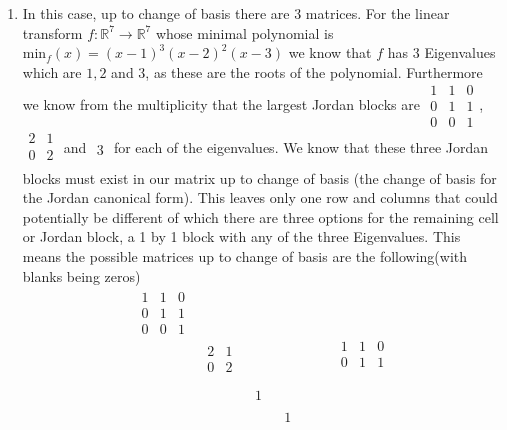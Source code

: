 \documentclass[12pt]{amsart}
\theoremstyle{definition}
\newcommand{\R}{\mathbb{R}}
\newcommand{\ra}{\rightarrow}
\begin{document}
\begin{enumerate}
\item In this case, up to change of basis there are $3$ matrices. For the linear transform $f:\R^7\ra \R^7$ whose minimal polynomial is $\text{min}_f(x)=(x-1)^3(x-2)^2(x-3)$ we know that $f$ has $3$ Eigenvalues which are $1,2$ and $3$, as these are the roots of the polynomial. Furthermore we know from the multiplicity that the largest Jordan blocks are $\boxed{\begin{matrix} 
1 & 1 & 0\\
0 & 1 & 1\\
0 & 0 & 1
\end{matrix}}$, $\boxed{\begin{matrix} 
2 & 1\\
0 & 2\\
\end{matrix}}$ and $\boxed{\begin{matrix} 
3
\end{matrix}}$ for each of the eigenvalues. We know that these three Jordan blocks must exist in our matrix up to change of basis (the change of basis for the Jordan canonical form). This leaves only one row and columns that could potentially be different of which there are three options for the remaining cell or Jordan block, a 1 by 1 block with any of the three Eigenvalues. This means the possible matrices up to change of basis are the following(with blanks being zeros)
$$\boxed{\begin{matrix} 
\boxed{\begin{matrix} 
1 & 1 & 0\\
0 & 1 & 1\\
0 & 0 & 1
\end{matrix}} &  &  &\\
 & \boxed{\begin{matrix} 
2 & 1\\
0 & 2\\
\end{matrix}} & & \\
 &  & \boxed{\begin{matrix} 1
\end{matrix}} &\\
&&& \boxed{\begin{matrix} 1
\end{matrix}}
\end{matrix}}\;
\;
\;\;\;\;\;
\boxed{\begin{matrix} 
\boxed{\begin{matrix} 
1 & 1 & 0\\
0 & 1 & 1\\

\end{matrix}}
\end{matrix}}$$
\end{enumerate}
\end{document}
